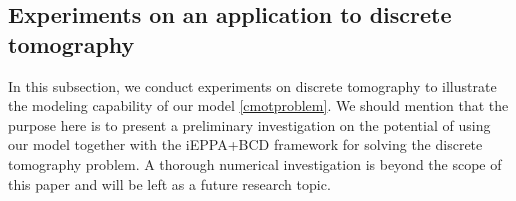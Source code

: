 \documentclass[10pt]{article}
\begin{document}









\subsection{Experiments on an application to discrete tomography}\label{numsec-tomo}

In this subsection, we conduct experiments on discrete tomography to illustrate the modeling capability of our model \eqref{cmotproblem}.
We should mention that the purpose here is to present a preliminary investigation on the potential of using our model together with the iEPPA+BCD framework for solving the discrete tomography problem. A thorough numerical investigation is beyond the scope of this paper and will be left as a future research topic.
\end{document}
